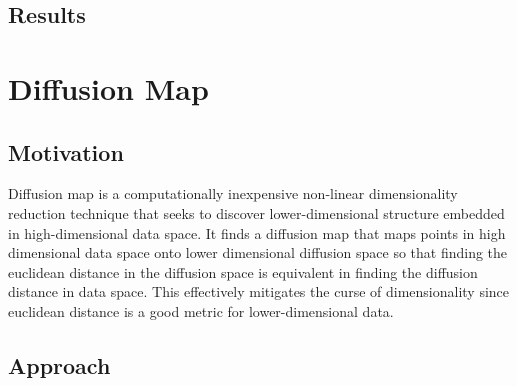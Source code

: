 \documentclass[11pt]{article}
\begin{document}
\subsection{Results}

\section{Diffusion Map} \label{sec: Diffusion Map}

\subsection{Motivation}
\hspace{5mm}Diffusion map is a computationally inexpensive non-linear dimensionality reduction technique that seeks to discover lower-dimensional structure embedded in high-dimensional data space. It finds a diffusion map that maps points in high dimensional data space onto lower dimensional diffusion space so that finding the euclidean distance in the diffusion space is equivalent in finding the diffusion distance in data space. This effectively mitigates the curse of dimensionality since euclidean distance is a good metric for lower-dimensional data.
\subsection{Approach}
\end{document}
